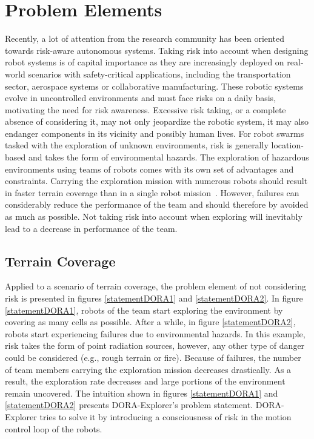 \section{Problem Elements}
Recently, a lot of attention from the research community has been oriented towards risk-aware autonomous systems. Taking risk into account when designing robot systems is of capital importance as they are increasingly deployed on real-world scenarios with safety-critical applications, including the transportation sector, aerospace systems or collaborative manufacturing. These robotic systems evolve in uncontrolled environments and must face risks on a daily basis, motivating the need for risk awareness. Excessive risk taking, or a complete absence of considering it, may not only jeopardize the robotic system, it may also endanger components in its vicinity and possibly human lives. For robot swarms tasked with the exploration of unknown environments, risk is generally location-based and takes the form of environmental hazards. The exploration of hazardous environments using teams of robots comes with its own set of advantages and constraints. Carrying the exploration mission with numerous robots should result in faster terrain coverage than in a single robot mission~\cite{burgard2005coordinated}.  However, failures can considerably reduce the performance of the team and should therefore by avoided as much as possible. Not taking risk into account when exploring will inevitably lead to a decrease in performance of the team. 

\subsection{Terrain Coverage}
\label{sec:problemCoverage}

Applied to a scenario of terrain coverage, the problem element of not considering risk is presented in figures \ref{statementDORA1} and \ref{statementDORA2}. In figure \ref{statementDORA1}, robots of the team start exploring the environment by covering as many cells as possible. After a while, in figure \ref{statementDORA2}, robots start experiencing failures due to environmental hazards. In this example, risk takes the form of point radiation sources, however, any other type of danger could be considered (e.g., rough terrain or fire). Because of failures, the number of team members carrying the exploration mission decreases drastically. As a result, the exploration rate decreases and large portions of the environment remain uncovered. The intuition shown in figures \ref{statementDORA1} and \ref{statementDORA2} presents DORA-Explorer's problem statement. DORA-Explorer tries to solve it by introducing a consciousness of risk in the motion control loop of the robots. 

